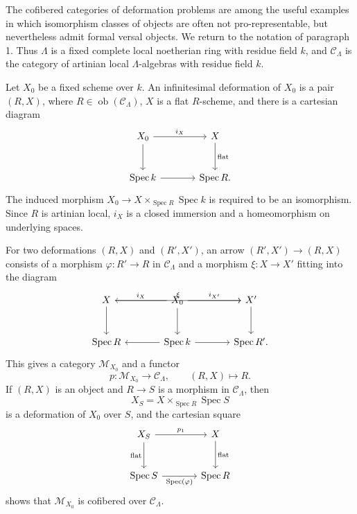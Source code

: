 \documentclass[11pt]{article}
\providecommand{\Spec}{\operatorname{Spec}}
\begin{document}
The cofibered categories of deformation problems are among the useful examples in which isomorphism classes of objects are often not pro-representable, but nevertheless admit formal versal objects. We return to the notation of paragraph 1. Thus \(\Lambda\) is a fixed complete local noetherian ring with residue field \(k\), and \(\mathcal C_\Lambda\) is the category of artinian local \(\Lambda\)-algebras with residue field \(k\).

Let \(X_0\) be a fixed scheme over \(k\). An infinitesimal deformation of \(X_0\) is a pair \((R,X)\), where \(R\in\operatorname{ob}(\mathcal C_\Lambda)\), \(X\) is a flat \(R\)-scheme, and there is a cartesian diagram
\[
\begin{tikzcd}[column sep=large,row sep=large]
 X_0 \arrow[r,"i_X"] \arrow[d] & X \arrow[d,"\mathrm{flat}"]\\
 \Spec k \arrow[r] & \Spec R .
\end{tikzcd}
\]
The induced morphism \(X_0\to X\times_{\Spec R}\Spec k\) is required to be an isomorphism. Since \(R\) is artinian local, \(i_X\) is a closed immersion and a homeomorphism on underlying spaces.

For two deformations \((R,X)\) and \((R',X')\), an arrow \((R',X')\to(R,X)\) consists of a morphism \(\varphi:R'\to R\) in \(\mathcal C_\Lambda\) and a morphism \(\xi:X\to X'\) fitting into the diagram
\[
\begin{tikzcd}[column sep=large,row sep=large]
 X \arrow[rr,"\xi"] \arrow[d] & X_0 \arrow[l,"i_X"'] \arrow[r,"i_{X'}"] \arrow[d] & X' \arrow[d]\\
 \Spec R & \Spec k \arrow[l] \arrow[r] & \Spec R'.
\end{tikzcd}
\]
This gives a category \(\mathcal M_{X_0}\) and a functor
\[
 p:\mathcal M_{X_0}\to\mathcal C_\Lambda,
 \qquad (R,X)\mapsto R.
\]
If \((R,X)\) is an object and \(R\to S\) is a morphism in \(\mathcal C_\Lambda\), then
\[
 X_S=X\times_{\Spec R}\Spec S
\]
is a deformation of \(X_0\) over \(S\), and the cartesian square
\[
\begin{tikzcd}[column sep=large,row sep=large]
 X_S \arrow[r,"p_1"] \arrow[d,"\mathrm{flat}"'] & X \arrow[d,"\mathrm{flat}"]\\
 \Spec S \arrow[r,"\Spec(\varphi)"'] & \Spec R
\end{tikzcd}
\]
shows that \(\mathcal M_{X_0}\) is cofibered over \(\mathcal C_\Lambda\).
\end{document}
